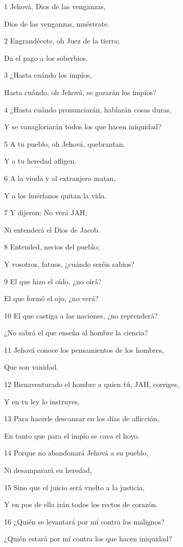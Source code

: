 \par 1 Jehová, Dios de las venganzas,
\par Dios de las venganzas, muéstrate.
\par 2 Engrandécete, oh Juez de la tierra;
\par Da el pago a los soberbios.
\par 3 ¿Hasta cuándo los impíos,
\par Hasta cuándo, oh Jehová, se gozarán los impíos?
\par 4 ¿Hasta cuándo pronunciarán, hablarán cosas duras,
\par Y se vanagloriarán todos los que hacen iniquidad?
\par 5 A tu pueblo, oh Jehová, quebrantan,
\par Y a tu heredad afligen.
\par 6 A la viuda y al extranjero matan,
\par Y a los huérfanos quitan la vida.
\par 7 Y dijeron: No verá JAH,
\par Ni entenderá el Dios de Jacob.
\par 8 Entended, necios del pueblo;
\par Y vosotros, fatuos, ¿cuándo seréis sabios?
\par 9 El que hizo el oído, ¿no oirá?
\par El que formó el ojo, ¿no verá?
\par 10 El que castiga a las naciones, ¿no reprenderá?
\par ¿No sabrá el que enseña al hombre la ciencia?
\par 11 Jehová conoce los pensamientos de los hombres,
\par Que son vanidad.
\par 12 Bienaventurado el hombre a quien tú, JAH, corriges,
\par Y en tu ley lo instruyes,
\par 13 Para hacerle descansar en los días de aflicción,
\par En tanto que para el impío se cava el hoyo.
\par 14 Porque no abandonará Jehová a su pueblo,
\par Ni desamparará su heredad,
\par 15 Sino que el juicio será vuelto a la justicia,
\par Y en pos de ella irán todos los rectos de corazón.
\par 16 ¿Quién se levantará por mí contra los malignos?
\par ¿Quién estará por mí contra los que hacen iniquidad?
